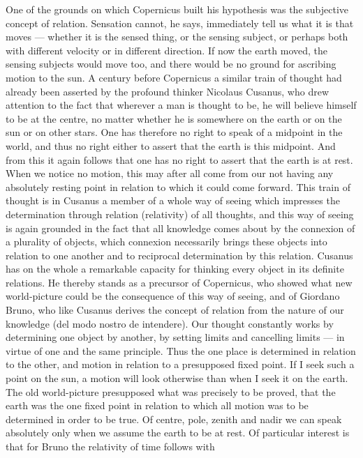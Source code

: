 \documentclass[12pt]{article}
\newcommand{\opage}[1]{\marginnote{\footnotesize\textit{[#1]}}}
\begin{document}
\noindent One of the grounds on which Copernicus built his hypothesis was
the subjective concept of relation. Sensation cannot, he says, \opage{63}immediately
tell us what it is that moves --- whether it is the sensed thing, or the
sensing subject, or perhaps both with different velocity or in different
direction. If now the earth moved, the sensing subjects would move too, and
there would be no ground for ascribing motion to the sun. A century before
Copernicus a similar train of thought had already been asserted by the
profound thinker Nicolaus Cusanus, who drew attention to the fact that
wherever a man is thought to be, he will believe himself to be at the
centre, no matter whether he is somewhere on the earth or on the sun or on
other stars. One has therefore no right to speak of a midpoint in the world,
and thus no right either to assert that the earth is this midpoint. And from
this it again follows that one has no right to assert that the earth is at
rest. When we notice no motion, this may after all come from our not having
any absolutely resting point in relation to which it could come forward.
This train of thought is in Cusanus a member of a whole way of seeing which
impresses the determination through relation (relativity) of all thoughts,
and this way of seeing is again grounded in the fact that all knowledge comes
about by the connexion of a plurality of objects, which connexion
necessarily brings these objects into relation to one another and to
reciprocal determination by this relation. Cusanus has on the whole a
remarkable capacity for thinking every object in its definite relations. He
thereby stands as a precursor of Copernicus, who showed what new world-picture
could be the consequence of this way of seeing, and of Giordano Bruno, who
like Cusanus derives the concept of relation from the nature of our knowledge
(del modo nostro de intendere). Our thought constantly works by determining
one object by another, by setting limits and \opage{64}cancelling limits --- in virtue
of one and the same principle. Thus the one place is determined in relation
to the other, and motion in relation to a presupposed fixed point. If I seek
such a point on the sun, a motion will look otherwise than when I seek it on
the earth. The old world-picture presupposed what was precisely to be
proved, that the earth was the one fixed point in relation to which all
motion was to be determined in order to be true. Of centre, pole, zenith and
nadir we can speak absolutely only when we assume the earth to be at rest.
Of particular interest is that for Bruno the relativity of time follows with
\end{document}
